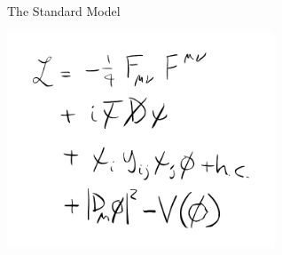 \documentclass[11pt, xcolor={dvipsnames}, aspectratio=169]{beamer}
\begin{document}
\begin{frame}{The Standard Model}
  \begin{center}
    \includegraphics[width=0.6\textwidth]{lagrangian/lagrangian_vectorized}
  \end{center}
\end{frame}

\end{document}
